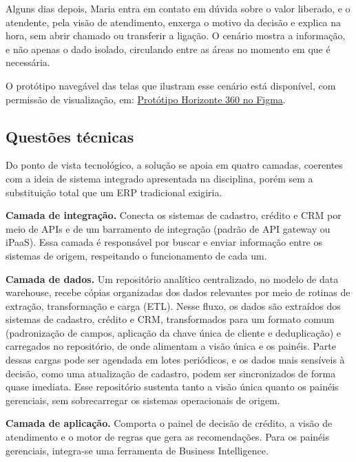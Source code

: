 \documentclass[12pt,a4paper]{article}
\begin{document}
Alguns dias depois, Maria entra em contato em d\'uvida sobre o valor liberado, e o atendente, pela vis\~ao de atendimento, enxerga o motivo da decis\~ao e explica na hora, sem abrir chamado ou transferir a liga\c{c}\~ao. O cen\'ario mostra a informa\c{c}\~ao, e n\~ao apenas o dado isolado, circulando entre as \'areas no momento em que \'e necess\'aria.

O prot\'otipo naveg\'avel das telas que ilustram esse cen\'ario est\'a dispon\'ivel, com permiss\~ao de visualiza\c{c}\~ao, em: \href{https://www.figma.com/proto/UnsN2hce1k4KrknhDKC4pH/Horizonte-360-Prototipo?node-id=0-1&t=61Jzl2soGHWPf1rG-1}{Prot\'otipo Horizonte 360 no Figma}.

\subsection{Quest\~oes t\'ecnicas}

Do ponto de vista tecnol\'ogico, a solu\c{c}\~ao se apoia em quatro camadas, coerentes com a ideia de sistema integrado apresentada na disciplina, por\'em sem a substitui\c{c}\~ao total que um ERP tradicional exigiria.

\textbf{Camada de integra\c{c}\~ao.} Conecta os sistemas de cadastro, cr\'edito e CRM por meio de APIs e de um barramento de integra\c{c}\~ao (padr\~ao de API gateway ou iPaaS). Essa camada \'e respons\'avel por buscar e enviar informa\c{c}\~ao entre os sistemas de origem, respeitando o funcionamento de cada um.

\textbf{Camada de dados.} Um reposit\'orio anal\'itico centralizado, no modelo de data warehouse, recebe c\'opias organizadas dos dados relevantes por meio de rotinas de extra\c{c}\~ao, transforma\c{c}\~ao e carga (ETL). Nesse fluxo, os dados s\~ao extra\'idos dos sistemas de cadastro, cr\'edito e CRM, transformados para um formato comum (padroniza\c{c}\~ao de campos, aplica\c{c}\~ao da chave \'unica de cliente e deduplica\c{c}\~ao) e carregados no reposit\'orio, de onde alimentam a vis\~ao \'unica e os pain\'eis. Parte dessas cargas pode ser agendada em lotes peri\'odicos, e os dados mais sens\'iveis \`a decis\~ao, como uma atualiza\c{c}\~ao de cadastro, podem ser sincronizados de forma quase imediata. Esse reposit\'orio sustenta tanto a vis\~ao \'unica quanto os pain\'eis gerenciais, sem sobrecarregar os sistemas operacionais de origem.

\textbf{Camada de aplica\c{c}\~ao.} Comporta o painel de decis\~ao de cr\'edito, a vis\~ao de atendimento e o motor de regras que gera as recomenda\c{c}\~oes. Para os pain\'eis gerenciais, integra-se uma ferramenta de Business Intelligence.
\end{document}
